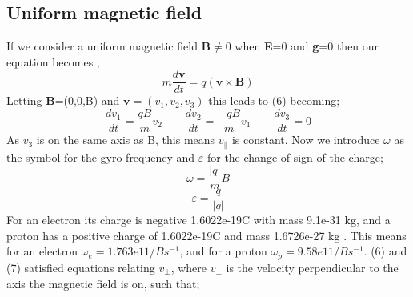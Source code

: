 \documentclass[14paper,11pt,hidelinks]{article}
\begin{document}
\subsection{Uniform magnetic field}
If we consider a uniform magnetic field \textbf{B}\begin{math}\ne\end{math}0 when \textbf{E}=0 and \textbf{g}=0 then our equation becomes \citep[pp. 19-62]{sturrock_plasma_1994};
\begin{equation}
m\frac{d\mathbf{v}}{dt}=q\left(\mathbf{v}\times\mathbf{B}\right)
\end{equation}
Letting \textbf{B}=(0,0,B) and \begin{math} \mathbf{v}=(v_1,v_2,v_3) \end{math} this leads to (6) becoming;
\begin{equation}
\frac{dv_1}{dt}=\frac{qB}{m}v_2
\qquad
\frac{dv_2}{dt}=\frac{-qB}{m}v_1
\qquad
\frac{dv_3}{dt}=0
\end{equation}
As $v_3$ is on the same axis as B, this means \begin{math} v_\parallel \end{math} is constant. Now we introduce \begin{math}\omega\end{math} as the symbol for the gyro-frequency and \begin{math}\varepsilon\end{math} for the change of sign of the charge;
\begin{equation}
\omega=\frac{|q|}{m}B
\end{equation}
\begin{equation}
\varepsilon=\frac{q}{|q|}
\end{equation}
For an electron its charge is negative 1.6022e-19C with mass 9.1e-31 kg, and a proton has a positive charge of 1.6022e-19C and mass 1.6726e-27 kg \citep{beiser_physics_1991}. This means for an electron \begin{math} \omega_e=1.763e11/Bs^{-1}\end{math}, and for a proton \begin{math} \omega_p=9.58e11/Bs^{-1}\end{math}. (6) and (7) satisfied equations relating \begin{math} v_\bot \end{math}, where \begin{math} v_\bot \end{math} is the velocity perpendicular to the axis the magnetic field is on, such that;
\end{document}
